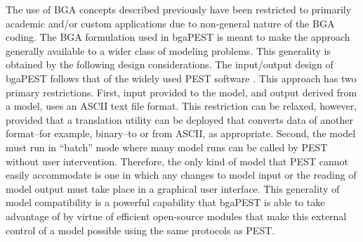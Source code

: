 \documentclass[11pt,oneside,onecolumn]{usgsreport}
\begin{document}
\begin{multicols}{2}


The use of BGA concepts described previously have been restricted
to primarily academic and/or custom applications due to non-general
nature of the BGA coding. The BGA formulation used in bgaPEST is meant
to make the approach generally available to a wider class of modeling
problems. This generality is obtained by the following design considerations.
The input/output design of bgaPEST follows that of the widely used
PEST software \citep{PEST,PESTAdd}. This approach has two primary
restrictions. First, input provided to the model, and output derived
from a model, uses an ASCII text file format. This restriction can
be relaxed, however, provided that a translation utility can be deployed
that converts data of another format--for example, binary--to or from
ASCII, as appropriate. Second, the model must run in ``batch'' mode
where many model runs can be called by PEST without user intervention.
Therefore, the only kind of model that PEST cannot easily accommodate
is one in which any changes to model input or the reading of model
output must take place in a graphical user interface. This generality
of model compatibility is a powerful capability that bgaPEST is able
to take advantage of by virtue of efficient open-source modules that
make this external control of a model possible using the same protocols
as PEST. 


\end{multicols}
\end{document}
